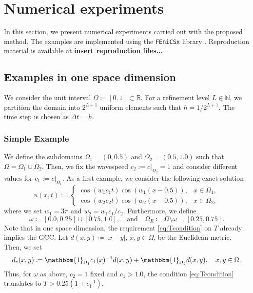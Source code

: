 \documentclass[sn-mathphys-num]{sn-jnl}
\numberwithin{equation}{section}
\begin{document}
\section{Numerical experiments}
\noindent In this section, we present numerical experiments carried out with the proposed method. The examples are implemented using the \texttt{FEniCSx} library \cite{BarattaEtal2023,BasixJoss,ScroggsEtal2022,AlnaesEtal2014}. Reproduction material is available at \textbf{insert reproduction files...}

\subsection{Examples in one space dimension}
\noindent We consider the unit interval $\Omega \coloneqq [0,1] \subset \mathbb{R}$. For a refinement level $L \in \mathbb{N}$, we partition the domain into $2^{L+1}$ uniform elements such that $h = 1/2^{L+1}$. The time step is chosen as $\Delta t = h$. 

\subsubsection{Simple Example}\label{sec:numex:1D:simple}
\noindent We define the subdomains $\Omega_1 = (0,0.5)$ and $\Omega_2 = (0.5,1.0)$ such that $\Omega = \overline{\Omega}_1 \cup \overline{\Omega}_2$. Then, we fix the wavespeed $c_2 := c \vert_{\Omega_2} = 1$ and consider different values for $c_1 := c \vert_{\Omega_1}$. As a first example, we consider the following exact solution \cite{MHI08}
\begin{equation}\label{eq:1D:exact:simple}
    u(x,t) := \begin{cases}
        \cos(w_1 c_1 t) \cos(w_1(x-0.5)), & x \in \Omega_1, \\
        \cos(w_2 c_2 t) \cos(w_2(x-0.5)), & x \in \Omega_2,
    \end{cases}
\end{equation}
where we set $w_1 = 3 \pi$ and $w_2 = w_1 c_1 / c_2$. Furthermore, we define
\begin{equation}
    \omega \coloneqq [0.0,0.25] \cup [0.75,1.0], \quad \text{and} \quad \Omega_R \coloneqq \Omega \setminus \omega = [0.25,0.75].
\end{equation}
Note that in one space dimension, the requirement \eqref{eq:Tcondition} on $T$ already implies the GCC. Let $d(x,y) \coloneqq \vert x - y \vert$, $x, y \in \Omega$, be the Euclidean metric. Then, we set
\begin{equation}
    d_c(x,y) \coloneqq \mathbbm{1}_{\Omega_1} c_1(x)^{-1} d(x,y) + \mathbbm{1}_{\Omega_2} d(x,y), \quad x,y \in \Omega.
\end{equation} 
Thus, for $\omega$ as above, $c_2 = 1$ fixed and $c_1 > 1.0$, the condition \eqref{eq:Tcondition} translates to $T > 0.25(1+c_1^{-1})$. 
\end{document}
